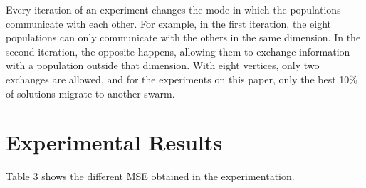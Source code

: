\documentclass[runningheads]{llncs}
\begin{document}
Every iteration of an experiment changes the mode in which the
populations communicate with each other. For example, in the first
iteration, the eight populations can only communicate with the others
in the same dimension. In the second iteration, the opposite happens,
allowing them to exchange information with a population outside that
dimension.   With eight vertices, only two exchanges are allowed, and
for the experiments on this paper, only the best 10\% of solutions
migrate to another swarm.

\section{Experimental Results}


Table 3 shows the different MSE obtained in the experimentation. %
\end{document}
